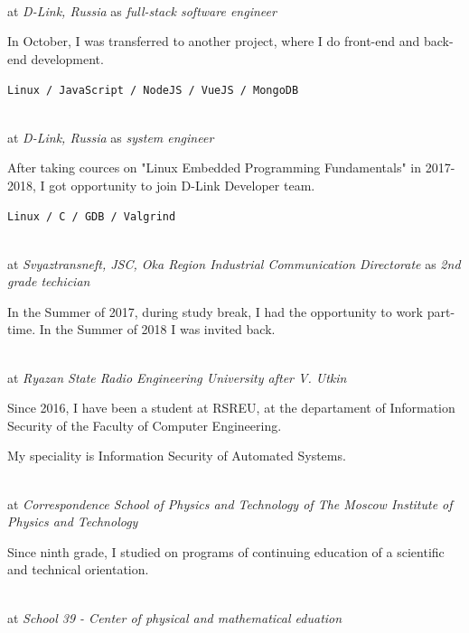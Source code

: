 \Sep


 \\
at \textit{D-Link, Russia}
as \textit{full-stack software engineer}
\SmallSep

In October, I was transferred to another project, where I do front-end and back-end development.
\SmallSep

\texttt{Linux / JavaScript / NodeJS / VueJS / MongoDB}

\SmallSep

 \\
at \textit{D-Link, Russia}
as \textit{system engineer}
\SmallSep

After taking cources on "Linux Embedded Programming Fundamentals" in 2017-2018, I got opportunity to join D-Link Developer team.
\SmallSep

\texttt{Linux / C / GDB / Valgrind}

\clearpage
\framebreak
\framebreak

 \\
at \textit{Svyaztransneft, JSC, Oka Region Industrial Communication Directorate}
as \textit{2nd grade techician}
\SmallSep

In the Summer of 2017, during study break, I had the opportunity to work part-time. In the Summer of 2018 I was invited back.

\Sep

 \\
at \textit{Ryazan State Radio Engineering University after V. Utkin}
\SmallSep

Since 2016, I have been a student at RSREU, at the departament of Information Security of the Faculty of Computer Engineering.

My speciality is Information Security of Automated Systems.

\SmallSep

 \\
at \textit{Correspondence School of Physics and Technology of The Moscow Institute of Physics and Technology}
\SmallSep

Since ninth grade, I studied on programs of continuing education of a scientific and technical orientation.

\SmallSep

 \\
at \textit{School 39 - Center of physical and mathematical eduation}
\SmallSep

